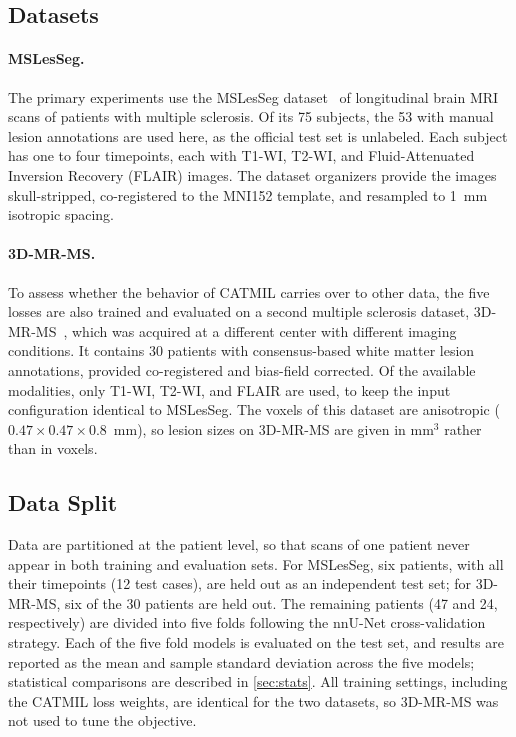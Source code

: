 \subsection{Datasets}

\paragraph{MSLesSeg.}
The primary experiments use the MSLesSeg
dataset~\cite{guarnera_mslesseg_2025} of longitudinal brain MRI scans of
patients with multiple sclerosis. Of its 75 subjects, the 53 with manual
lesion annotations are used here, as the official test set is unlabeled.
Each subject has one to four timepoints, each with T1-WI, T2-WI, and Fluid-Attenuated Inversion Recovery (FLAIR)
images. The dataset organizers provide the images skull-stripped,
co-registered to the MNI152 template, and resampled to 1~mm isotropic
spacing.

\paragraph{3D-MR-MS.}
To assess whether the behavior of CATMIL carries over to other data, the
five losses are also trained and evaluated on a second multiple sclerosis
dataset, 3D-MR-MS~\cite{lesjak_novel_2018}, which was acquired at a
different center with different imaging conditions. It contains 30
patients with consensus-based white matter lesion annotations, provided
co-registered and bias-field corrected. Of the available modalities, only
T1-WI, T2-WI, and FLAIR are used, to keep the input configuration identical
to MSLesSeg. The voxels of this dataset are anisotropic
($0.47 \times 0.47 \times 0.8$~mm), so lesion sizes on 3D-MR-MS are given
in mm$^3$ rather than in voxels.

\subsection{Data Split}

Data are partitioned at the patient level, so that scans of one patient
never appear in both training and evaluation sets. For MSLesSeg, six
patients, with all their timepoints (12 test cases), are held out as an
independent test set; for 3D-MR-MS, six of the 30 patients are held out.
The remaining patients (47 and 24, respectively) are divided into five
folds following the nnU-Net cross-validation strategy. Each of the five
fold models is evaluated on the test set, and results are reported as the
mean and sample standard deviation across the five models; statistical
comparisons are described in \cref{sec:stats}. All training
settings, including the CATMIL loss weights, are identical for the two
datasets, so 3D-MR-MS was not used to tune the objective.

